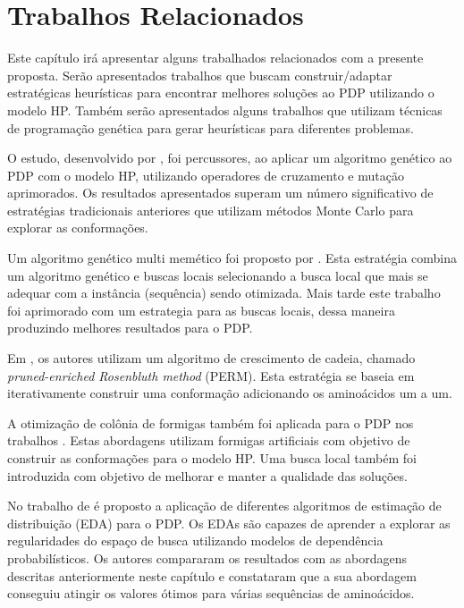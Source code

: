 \chapter{Trabalhos Relacionados}
\label{cap:Trabalhos Relacionados}

Este capítulo irá apresentar alguns trabalhados relacionados com a presente proposta. Serão apresentados trabalhos que buscam construir/adaptar estratégicas heurísticas para encontrar melhores soluções ao PDP utilizando o modelo HP. Também serão apresentados alguns trabalhos que utilizam técnicas de programação genética para gerar heurísticas para diferentes problemas.



O estudo, desenvolvido por \cite{unger1993genetic}, foi percussores, ao aplicar um algoritmo genético ao PDP com o modelo HP, utilizando operadores de cruzamento e mutação aprimorados. Os resultados apresentados superam um número significativo de estratégias tradicionais anteriores que utilizam métodos Monte Carlo para explorar as conformações. 

Um algoritmo genético multi memético foi proposto por \cite{krasnogor2002multimeme}. Esta estratégia combina um algoritmo genético e buscas locais selecionando a busca local que mais se adequar com a instância (sequência) sendo otimizada. Mais tarde este trabalho foi aprimorado com um estrategia  para as buscas locais, dessa maneira produzindo melhores resultados para o PDP.

Em \cite{hsu2003growth}, os autores utilizam um algoritmo de crescimento de cadeia, chamado \textit{pruned-enriched Rosenbluth method} (PERM). Esta estratégia se baseia em iterativamente construir uma conformação adicionando os aminoácidos um a um. 

A otimização de colônia de formigas também foi aplicada para o PDP nos trabalhos \cite{shmygelska2002ant,shmygelska2003improved}. Estas abordagens utilizam formigas artificiais com objetivo de construir as conformações para o modelo HP. Uma busca local também foi introduzida com objetivo de melhorar e manter a qualidade das soluções. 

No trabalho de \cite{santana2008protein} é proposto a aplicação de diferentes algoritmos de estimação de distribuição (EDA) para o PDP. Os EDAs são capazes de aprender a explorar as regularidades do espaço de busca utilizando modelos de dependência probabilísticos. Os autores compararam os resultados com as abordagens descritas anteriormente neste capítulo e constataram que a sua abordagem conseguiu atingir os valores ótimos para várias sequências de aminoácidos.

